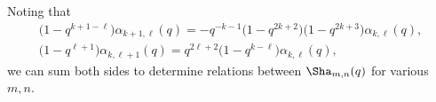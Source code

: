 \documentclass[pdftex]{sigma}
\numberwithin{equation}{section}
\def\be{\begin{equation}}
\def\ee{\end{equation}}
\def\WRT{\Sha}
\def\be{\begin{equation}}
\def\ee{\end{equation}}
\begin{document}
Noting that
\begin{gather}
 \bigl(1-q^{k+1-\ell}\bigr)\alpha_{k+1,\ell}(q)
  =-q^{-k-1}\bigl(1-q^{2k+2}\bigr)\bigl(1-q^{2k+3}\bigr)\alpha_{k,\ell}(q),\nonumber\\
 \bigl(1-q^{\ell+1}\bigr)\alpha_{k,\ell+1}(q)
  =q^{2\ell+2}\bigl(1-q^{k-\ell}\bigr)\alpha_{k,\ell}(q) ,\label{alpharec}
\end{gather}
we can sum both sides to determine relations between $\WRT_{m,n}(q)$ for various $m,n$.
\end{document}
